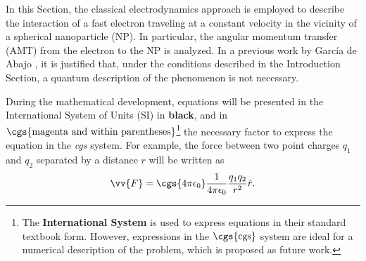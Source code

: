 \label{cap: teoria metodos}
\vspace{-1.0cm}
In this Section, the classical electrodynamics approach is employed to describe the interaction of a fast electron traveling at a constant velocity in the vicinity of a spherical nanoparticle (NP). In particular, the angular momentum transfer (AMT) from the electron to the NP is analyzed. In a previous work by García de Abajo \cite{deabajo2021optical}, it is justified that, under the conditions described in the Introduction Section, a quantum description of the phenomenon is not necessary.

During the mathematical development, equations will be presented in the International System of Units (SI) in \textbf{black}, and in $\cgs{\text{magenta and within parentheses}}$\footnote{The \textbf{International System} is used to express equations in their standard textbook form. However, expressions in the $\cgs{\text{cgs}}$ system are ideal for a numerical description of the problem, which is proposed as future work.} the necessary factor to express the equation in the \textit{cgs} system. For example, the force between two point charges $q_1$ and $q_2$ separated by a distance $r$ will be written as
\begin{equation}
\vv{F} = \cgs{4\pi\epsilon_0}\frac{1}{4\pi\epsilon_0} \frac{q_1 q_2}{r^2} \hat{r}.
\end{equation}
%
%
